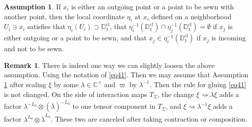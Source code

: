 \documentclass[12pt,a4paper,notitlepage]{article}
\theoremstyle{definition}
\newtheorem{rem}[df]{Remark}
\newtheorem{ass}[df]{Assumption}
\theoremstyle{plain}
\newcommand{\ovl}{\overline}
\newcommand{\Cbb}{\mathbb C}
\newcommand{\Dbb}{\mathbb D}
\newcommand{\cl}{\mathrm{cl}}
\numberwithin{equation}{section}
\begin{document}
\begin{ass}\label{lb32}
If $x_i$ is either an outgoing point or a point to be sewn with another point, then the local coordinate $\eta_i$ at $x_i$ defined on a neighborhood $U_i\ni x_i$ satisfies that $\eta_i(U_i)\supset\Dbb_1^\cl$, that $\eta_i^{-1}(\Dbb_1^\cl)\cap \eta_j^{-1}(\Dbb_1^\cl)=\emptyset$ if $x_j$ is either outgoing or a point to be sewn, and that $x_j\in\eta_i^{-1}(\Dbb_1^\cl)$ if $x_j$ is incoming and not to be sewn.
\end{ass}








\begin{rem}\label{lb34}
There is indeed one way we can slightly loosen the above assumption. Using the notation of \eqref{eq41}. Then we may assume that Assumption \ref{lb32} after scaling $\xi$ by some $\lambda\in\Cbb^\times$ and $\varpi$ by $\lambda^{-1}$. Then the rule for gluing \eqref{eq41} is not changed. On the side of interaction maps $T_{\Sigma}$, the change $\xi\rightsquigarrow \lambda \xi$ adds a factor $\lambda^{-L_0}\otimes(\ovl\lambda)^{-\ovl L_0}$ to one tensor component in $T_\Sigma$, and  $\xi\rightsquigarrow \lambda^{-1} \xi$ adds a factor $\lambda^{L_0}\otimes\ovl\lambda^{\ovl L_0}$. These two are canceled after taking contraction or composition.
\end{rem}


\subsection{}
\end{document}

